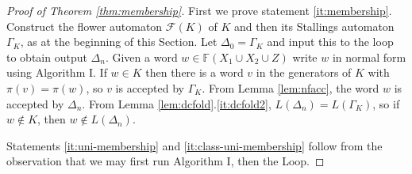 \documentclass[a4paper,12pt]{article}
\newcommand{\G}{\Gamma }
\newcommand{\D}{\Delta }
\renewcommand{\L}{\Lambda }
\renewcommand{\S}{\Sigma }
\newcommand{\cA}{{\cal{A}}}
\newcommand{\cF}{{\cal{F}}}
\newtheorem{theorem}{Theorem}[section]
\numberwithin{equation}{section}
\numberwithin{figure}{section}
\newcommand{\FF}{\ensuremath{\mathbb{F}}}
\renewcommand{\cF}{\mathcal{F}}
\begin{document}

\begin{proof}[Proof of Theorem \ref{thm:membership}]
First we prove statement \ref{it:membership}. 
Construct the flower automaton $\cF(K)$ of $K$ and then
its Stallings automaton $\G_K$,  as at the beginning of this Section. %
Let $\D_0=\G_K$ and input this to the loop to obtain output $\D_n$.
Given a word $w\in \FF(X_1\cup X_2\cup Z)$ write $w$ in normal form
using Algorithm I. If $w\in K$ then there is a word $v$ in the generators
 of $K$ with $\pi(v)=\pi(w)$, so $v$ is accepted by $\G_K$. From
Lemma \ref{lem:nfacc}, the word $w$ is accepted by $\D_n$. From
Lemma \ref{lem:dcfold}.\ref{it:dcfold2}, $L(\D_n)=L(\G_K)$,
so if $w\notin K$, then
$w\notin L(\D_n)$.

Statements \ref{it:uni-membership} and \ref{it:class-uni-membership} follow
from the observation that we may 
first run Algorithm I, then the Loop.
\end{proof}
\end{document}
